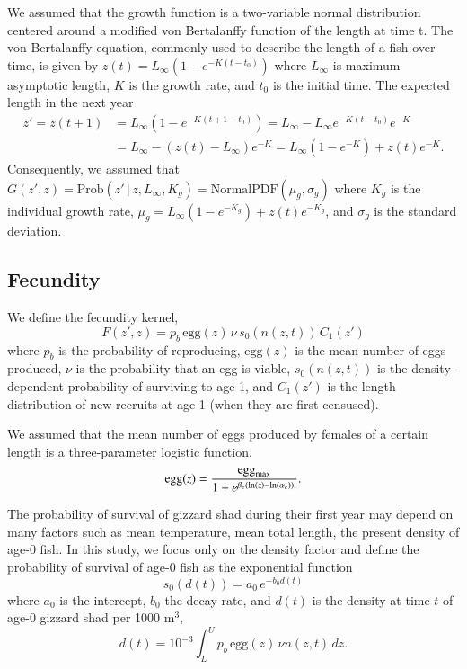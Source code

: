 \documentclass[preprint,review,12pt,authoryear]{elsarticle}
\def\ds{\displaystyle}
\begin{document}
We assumed that the growth function is a two-variable normal distribution centered around a modified von Bertalanffy function of the length at time t. 
The von Bertalanffy equation, commonly used to describe the length of a fish over time, is given by $\ds z(t) = L_{\infty} \left(1-e^{-K(t-t_0)} \right)$ where $L_\infty$ is maximum asymptotic length, $K$ is the growth rate, and $t_0$ is the initial time. 
The expected length in the next year
\begin{align*}
 z' =z(t+1) & =  L_{\infty} \left(1-e^{-K(t+1-t_0)} \right) =  L_{\infty} - L_{\infty}e^{-K(t-t_0)} e^{-K} \\
 & =   L_\infty - \left( z(t)-L_\infty \right) e^{-K} =   L_{\infty} \left(1-e^{-K} \right) + z(t)e^{-K}. 
 \end{align*}
Consequently, we assumed that 
$\ds G(z',z) = \mathrm{Prob}(z' \, | \,  z, L_{\infty}, K_g) = \mathrm{Normal PDF}(\mu_g, \sigma_g)$
where $K_g$ is the individual growth rate, $\mu_g =  L_{\infty} \left(1-e^{-K_g} \right) + z(t)e^{-K_g}$, and $\sigma_g$ is the standard deviation.

\subsection{Fecundity}
We define the fecundity kernel, 
\begin{equation}\label{eq:fecundity}
F(z', z) = p_b \, \mbox{egg}(z) \, \nu \, s_0(n(z,t)) \, C_1(z')
\end{equation}
where $p_b$ is the probability of reproducing, $\mbox{egg}(z)$ is the mean number of eggs produced, $\nu$ is the probability that an egg is viable, $s_0(n(z,t))$ is the density-dependent probability of surviving to age-1, and $C_1 (z')$ is the length distribution of new recruits at age-1 (when they are first censused).

We assumed that the mean number of eggs produced by females of a certain length is a three-parameter logistic function,
\begin{equation}\label{eq:egg}
\mbox{egg}(z) = \frac{\mbox{egg}_{\rm max}}{1+e^{\beta_e(\ln(z)-\ln(\alpha_e)),}}.
\end{equation}

The probability of survival of gizzard shad during their first year may depend on many factors \citep{michaletz2010overwinter} such as mean temperature, mean total length, the present density of age-0 fish.  
In this study, we focus only on the density factor and define the probability of survival of age-0 fish as the exponential function
\begin{equation}\label{eq:s0}
s_0(d(t)) = a_0 \, e^{-b_0 d(t)}
\end{equation}
where $a_0$ is the intercept, $b_0$ the decay rate, and $d(t)$ is the density at time $t$ of age-0 gizzard shad per 1000 m$^3$, 
\[ d(t) = 10^{-3} \int_L^U p_b \, \mbox{egg}(z) \, \nu n(z,t) \, dz. \]  
\end{document}

